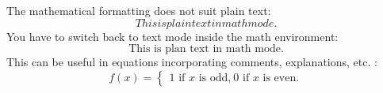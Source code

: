 \documentclass[a4paper]{article}
\begin{document}

The mathematical formatting does not suit plain text:
\begin{equation}
	This is plain text in math mode.
\end{equation}
You have to switch back to text mode inside the math environment:
\begin{equation}
	\textrm{This is plan text in math mode.}
\end{equation}
This can be useful in equations incorporating comments, explanations, etc. :
\begin{equation}
	f(x) = \left\{ \begin{array}{l} \textrm{$1$ if $x$ is odd,} \
\textrm{$0$ if $x$ is even.} \end{array}\right.
\end{equation}
\end{document}
